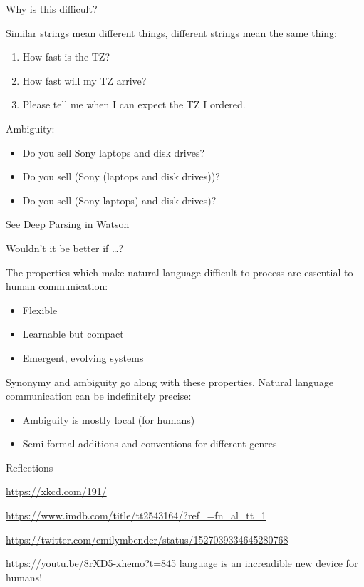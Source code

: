\documentclass[compress]{beamer}
\begin{document}
\begin{frame}{Why is this difficult?}

Similar strings mean different things, different strings mean the same
thing:
\begin{enumerate}[<+->]
\item How fast is the TZ?
\item How fast will my TZ arrive?
\item Please tell me when I can expect the TZ I ordered.
\end{enumerate}
Ambiguity:
\begin{itemize}[<+->]
\item Do you sell Sony laptops and disk drives?
\item Do you sell (Sony (laptops and disk drives))?
\item Do you sell (Sony laptops) and disk drives)?
\end{itemize}

See \href{https://brenocon.com/watson_special_issue/03\%20Deep\%20parsing.pdf}{Deep Parsing in Watson}
\end{frame} 


\begin{frame}{Wouldn't it be better if \ldots?}

The properties which make natural language difficult to process are essential
to human communication:
\begin{itemize}
\item Flexible 
\item Learnable but compact 
\item Emergent, evolving systems
\end{itemize}
Synonymy and ambiguity go along with these properties.
\pause
Natural language communication can be indefinitely precise:
\begin{itemize}
\item Ambiguity is mostly local (for humans)
\item Semi-formal additions and conventions for different genres
\end{itemize}
\end{frame} 


\begin{frame}{Reflections}

  \url{https://xkcd.com/191/}

  \url{https://www.imdb.com/title/tt2543164/?ref_=fn_al_tt_1}

  \url{https://twitter.com/emilymbender/status/1527039334645280768}

  \url{https://youtu.be/8rXD5-xhemo?t=845} language is an increadible
  new device for humans!

\end{frame}
\end{document}
